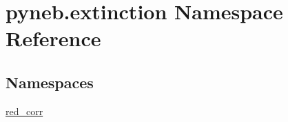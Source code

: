 \hypertarget{namespacepyneb_1_1extinction}{}\section{pyneb.\+extinction Namespace Reference}
\label{namespacepyneb_1_1extinction}
\subsection*{Namespaces}
\begin{DoxyCompactItemize}
\item 
 \hyperlink{namespacepyneb_1_1extinction_1_1red__corr}{red\+\_\+corr}
\end{DoxyCompactItemize}
